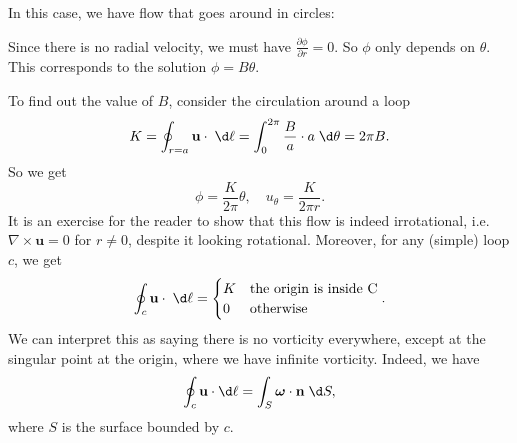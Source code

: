\documentclass[a4paper]{article}
\begin{document}
\begin{eg}
  In this case, we have flow that goes around in circles:
  \begin{center}
  \end{center}
  Since there is no radial velocity, we must have $\frac{\partial \phi}{\partial r} = 0$. So $\phi$ only depends on $\theta$. This corresponds to the solution $\phi = B\theta$.

  To find out the value of $B$, consider the circulation around a loop
  \[
    K = \oint_{r = a} \mathbf{u}\cdot \;\d \ell = \int_0^{2\pi} \frac{B}{a} \cdot a \;\d \theta = 2\pi B.
  \]
  So we get
  \[
    \phi = \frac{K}{2\pi}\theta,\quad u_\theta = \frac{K}{2\pi r}.
  \]
  It is an exercise for the reader to show that this flow is indeed irrotational, i.e.\ $\nabla \times \mathbf{u} = 0$ for $r \not= 0$, despite it looking rotational. Moreover, for any (simple) loop $c$, we get
  \[
    \oint_c \mathbf{u}\cdot\;\d \ell =
    \begin{cases}
      K & \text{the origin is inside C}\\
      0 & \text{otherwise}
    \end{cases}.
  \]
  We can interpret this as saying there is no vorticity everywhere, except at the singular point at the origin, where we have infinite vorticity. Indeed, we have
  \[
    \oint_c \mathbf{u}\cdot \d \ell = \int_S \boldsymbol\omega \cdot \mathbf{n} \;\d S,
  \]
  where $S$ is the surface bounded by $c$.
\end{eg}
\end{document}
